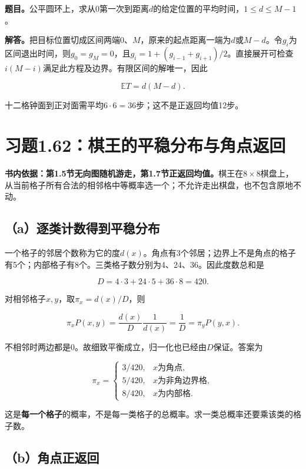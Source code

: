 \documentclass[
  11pt,a4paper,UTF8,fontset=fandol]{ctexart}
\begin{document}
\textbf{题目。}公平圆环上，求从0第一次到距离\(d\)的给定位置的平均时间，\(1\le d\le M-1\)。

\textbf{解答。}把目标位置切成区间两端0、\(M\)，原来的起点距离一端为\(d\)或\(M-d\)。令\(g_i\)为区间退出时间，则\(g_0=g_M=0\)，且\(g_i=1+(g_{i-1}+g_{i+1})/2\)。直接展开可检查\(i(M-i)\)满足此方程及边界。有限区间的解唯一，因此

\[\boxed{\mathbb ET=d(M-d).}\]

十二格钟面到正对面需平均\(6\cdot6=36\)步；这不是正返回均值12步。

\section{习题1.62：棋王的平稳分布与角点返回}\label{ux4e60ux98981.62ux68cbux738bux7684ux5e73ux7a33ux5206ux5e03ux4e0eux89d2ux70b9ux8fd4ux56de}

\textbf{书内依据：第1.5节无向图随机游走，第1.7节正返回均值。}棋王在\(8\times8\)棋盘上，从当前格子所有合法的相邻格中等概率选一个；不允许走出棋盘，也不包含原地不动。

\subsection{（a）逐类计数得到平稳分布}\label{aux9010ux7c7bux8ba1ux6570ux5f97ux5230ux5e73ux7a33ux5206ux5e03}

一个格子的邻居个数称为它的度\(d(x)\)。角点有3个邻居；边界上不是角点的格子有5个；内部格子有8个。三类格子数分别为4、24、36。因此度数总和是

\[D=4\cdot3+24\cdot5+36\cdot8=420.\]

对相邻格子\(x,y\)，取\(\pi_x=d(x)/D\)，则

\[\pi_xP(x,y)=\frac{d(x)}D\frac1{d(x)}=\frac1D=\pi_yP(y,x).\]

不相邻时两边都是0。故细致平衡成立，归一化也已经由\(D\)保证。答案为

\[
\boxed{\pi_x=
\begin{cases}
3/420,&x\text{为角点},\\
5/420,&x\text{为非角边界格},\\
8/420,&x\text{为内部格}.
\end{cases}}
\]

这是\textbf{每一个格子}的概率，不是每一类格子的总概率。求一类总概率还要乘该类的格子数。

\subsection{（b）角点正返回}\label{bux89d2ux70b9ux6b63ux8fd4ux56de}
\end{document}
